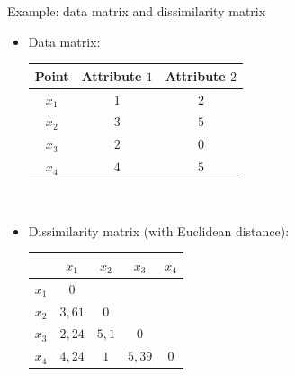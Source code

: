 \documentclass[aspectratio=169,t]{beamer}
\begin{document}
  { 
    \begin{frame}{Example: data matrix and dissimilarity matrix}

        \begin{itemize}
          \item Data matrix: \\[0.1cm]
        \begin{tabular}{| c | c | c |}
        \hline
        Point & Attribute $1$ & Attribute $2$\\\hline
        $x_1$ & $1$ & $2$\\\hline
        $x_2$ & $3$ & $5$\\\hline
        $x_3$ & $2$ & $0$\\\hline
        $x_4$ & $4$ & $5$\\\hline
        \end{tabular}\\[0.5cm]
        \item Dissimilarity matrix (with Euclidean distance): \\[0.1cm]
        \begin{tabular}{| c | c | c | c | c |}
        \hline
         & $x_1$ & $x_2$ & $x_3$ & $x_4$\\\hline
        $x_1$ & $0$ & & & \\\hline
        $x_2$ & $3,61$ & $0$ & & \\\hline
        $x_3$ & $2,24$ & $5,1$ & $0$ & \\\hline
        $x_4$ & $4,24$ & $1$ & $5,39$ & $0$ \\\hline
        \end{tabular}\\[0.2cm]
        \end{itemize}
    \end{frame}
  }
\end{document}
